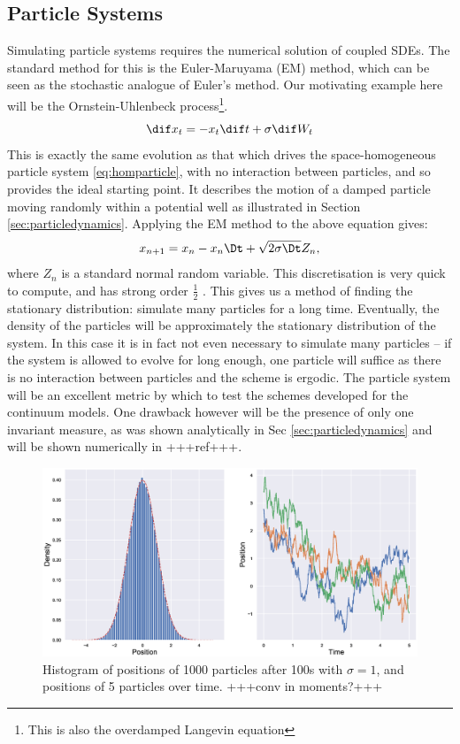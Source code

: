 \subsection{Particle Systems}
Simulating particle systems requires the numerical solution of coupled SDEs. The standard method for this is the Euler-Maruyama (EM) method, which can be seen as the stochastic analogue of Euler's method. Our motivating example here will be the Ornstein-Uhlenbeck process\footnote{This is also the overdamped Langevin equation}. 
\begin{equation}
\dif x_t = - x_t \dif t + \sigma \dif W_t
\end{equation}
This is exactly the same evolution as that which drives the space-homogeneous particle system \eqref{eq:homparticle}, with no interaction between particles, and so provides the ideal starting point. It describes the motion of a damped particle moving randomly within a potential well as illustrated in Section \ref{sec:particledynamics}. Applying the EM method to the above equation gives:
\[ x_{n+1} = x_n -  x_n\Dt + \sqrt{2\sigma\Dt}Z_n,  \]
where $Z_n$ is a standard normal random variable. This discretisation is very quick to compute, and has strong order $\frac{1}{2}$ \cite{Higham01}. This gives us a method of finding the stationary distribution: simulate many particles for a long time. Eventually, the density of the particles will be approximately the stationary distribution of the system. In this case it is in fact not even necessary to simulate many particles -- if the system is allowed to evolve for long enough, one particle will suffice as there is no interaction between particles and the scheme is ergodic. The particle system will be an excellent metric by which to test the schemes developed for the continuum models. One drawback however will be the presence of only one invariant measure, as was shown analytically in Sec \ref{sec:particledynamics} and will be shown numerically in +++ref+++.
\begin{figure}
    \centering
    \includegraphics[width=0.7\linewidth]{Figures/OUparticletraj}
    \caption{Histogram of positions of 1000 particles after 100s with $\sigma = 1$, and positions of 5 particles over time. +++conv in moments?+++}
    \label{fig:ouparticletraj}
\end{figure}

